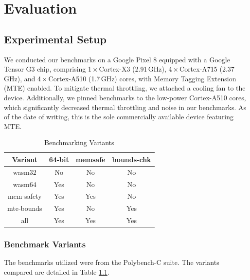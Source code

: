 \chapter{Evaluation}
\label{ch:eval}


\section{Experimental Setup}\label{sec:experimental-setup}

We conducted our benchmarks on a Google Pixel 8 equipped with a Google Tensor G3 chip, comprising 1\,$\times$\,Cortex-X3 (2.91\,GHz), 4\,$\times$\,Cortex-A715 (2.37\,GHz), and 4\,$\times$\,Cortex-A510 (1.7\,GHz) cores, with Memory Tagging Extension (MTE) enabled.
To mitigate thermal throttling, we attached a cooling fan to the device.
Additionally, we pinned benchmarks to the low-power Cortex-A510 cores, which significantly decreased thermal throttling and noise in our benchmarks. 
As of the date of writing, this is the sole commercially available device featuring MTE.

\begin{table}[ht]
    \centering
    \small
    \begin{tabular}{c || c c c}
        \hline
        \textbf{Variant} & \textbf{64-bit} & \textbf{memsafe} & \textbf{bounds-chk} \\
        \hline
        wasm32           & No              & No               & No                  \\
        wasm64           & Yes             & No               & No                  \\
        mem-safety       & Yes             & Yes              & No                  \\
        mte-bounds       & Yes             & No               & Yes                 \\
        all              & Yes             & Yes              & Yes                 \\
        \hline
    \end{tabular}
    \caption{Benchmarking Variants}
    \label{tab:benchmark-variants}
\end{table}

\subsection{Benchmark Variants}\label{subsec:benchmark-variants}
The benchmarks utilized were from the Polybench-C suite.
The variants compared are detailed in Table \ref{tab:benchmark-variants}.

